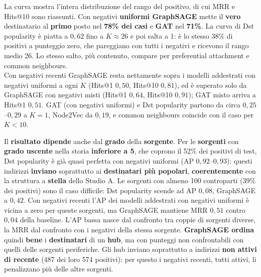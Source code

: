 \documentclass[11pt]{article}
\begin{document}
La curva mostra l'intera distribuzione del rango del positivo, di cui MRR
e Hits@10 sono riassunti. Con negativi \textbf{uniformi GraphSAGE} mette il \textbf{vero}
destinatario al \textbf{primo} posto nel \textbf{78\% dei casi} e\textbf{ GAT} nel\textbf{ 71\%}. La
curva di Dst popularity è piatta a $0{,}62$ fino a $K \approx 26$ e poi
salta a 1: è lo stesso 38\% di positivi a punteggio zero, che pareggiano con
tutti i negativi e ricevono il rango medio 26. Lo stesso salto, più
contenuto, compare per preferential attachment e common neighbours.\\ Con
negativi recenti GraphSAGE resta nettamente sopra i modelli addestrati con
negativi uniformi a ogni $K$ (Hits@1 $0{,}50$, Hits@10 $0{,}81$), ed è
superato solo da GraphSAGE con negativi misti (Hits@1 $0{,}64$, Hits@10
$0{,}91$); GAT misto arriva a Hits@1 $0{,}51$. GAT (con negativi uniformi) e Dst popularity partono da
circa $0{,}25$--$0{,}29$ a $K = 1$, Node2Vec da $0{,}19$, e common neighbours coincide
con il caso per $K < 10$.

Il \textbf{risultato dipende} anche dal \textbf{grado} della \textbf{sorgente}. Per le \textbf{sorgenti} con
\textbf{grado uscente} nella storia \textbf{inferiore a 5}, che coprono il 52\% dei positivi
di test, Dst popularity è già quasi perfetta con negativi uniformi (AP
$0{,}92$--$0{,}93$): questi indirizzi \textbf{inviano} soprattutto ai \textbf{destinatari
più popolari}, \textbf{coerentemente }con la struttura a \textbf{stella} dello Studio A. Le
sorgenti con almeno 100 controparti (39\% dei positivi) sono il caso
difficile: Dst popularity scende ad AP $0{,}08$, GraphSAGE a $0{,}42$. Con
negativi recenti l'AP dei modelli addestrati con negativi uniformi è vicina
a zero per queste sorgenti, ma GraphSAGE mantiene MRR $0{,}51$ contro
$0{,}04$ della baseline. L'AP bassa nasce dal confronto tra coppie di
sorgenti diverse, la MRR dal confronto con i negativi della stessa
sorgente. \textbf{GraphSAGE ordina} quindi \textbf{bene} i \textbf{destinatari} di un \textbf{hub}, ma con
punteggi non confrontabili con quelli delle sorgenti periferiche. Gli hub
inviano soprattutto a indirizzi \textbf{non attivi di recente} (487 dei loro 574
positivi): per questo i negativi recenti, tutti attivi, li penalizzano più
delle altre sorgenti.
\end{document}
